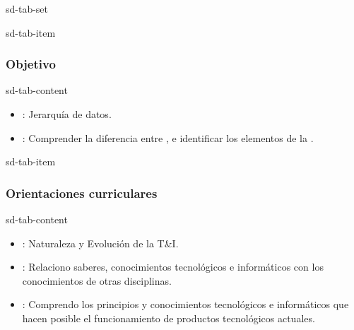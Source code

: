 \documentclass[letterpaper,10pt,spanish]{sphinxmanual}
\begin{document}
\begin{sphinxuseclass}{sd-tab-set}
\begin{sphinxuseclass}{sd-tab-item}\subsubsection*{Objetivo}

\begin{sphinxuseclass}{sd-tab-content}
\sphinxAtStartPar
{}
\begin{itemize}
\item {} 
\sphinxAtStartPar
{}: Jerarquía de datos.

\item {} 
\sphinxAtStartPar
{}: Comprender la diferencia entre ,  e identificar los elementos de la .

\end{itemize}

\end{sphinxuseclass}
\end{sphinxuseclass}
\begin{sphinxuseclass}{sd-tab-item}\subsubsection*{Orientaciones curriculares}

\begin{sphinxuseclass}{sd-tab-content}\begin{itemize}
\item {} 
\sphinxAtStartPar
{}: Naturaleza y Evolución de la T\&I.

\item {} 
\sphinxAtStartPar
{}: Relaciono saberes, conocimientos tecnológicos e informáticos con los conocimientos de otras disciplinas.

\item {} 
\sphinxAtStartPar
{}: Comprendo los principios y conocimientos tecnológicos e informáticos que hacen posible el funcionamiento de productos tecnológicos actuales.


\end{itemize}
\end{sphinxuseclass}
\end{sphinxuseclass}
\end{sphinxuseclass}
\end{document}
